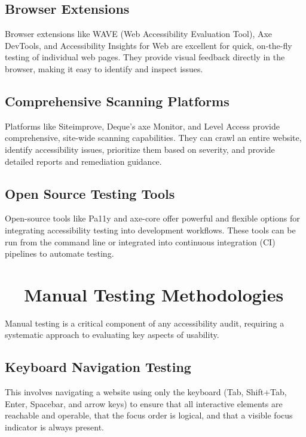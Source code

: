 \subsection{Browser Extensions}
\label{subsec:browser-extensions}
Browser extensions like WAVE (Web Accessibility Evaluation Tool), Axe DevTools, and Accessibility Insights for Web are excellent for quick, on-the-fly testing of individual web pages. They provide visual feedback directly in the browser, making it easy to identify and inspect issues.
\supercite{WebAIMWave, DequeAxeDevTools, MicrosoftInsights}

\subsection{Comprehensive Scanning Platforms}
\label{subsec:scanning-platforms}
Platforms like Siteimprove, Deque's axe Monitor, and Level Access provide comprehensive, site-wide scanning capabilities. They can crawl an entire website, identify accessibility issues, prioritize them based on severity, and provide detailed reports and remediation guidance.
\supercite{SiteimproveAccessibility, DequeWorldSpace, AudioEyeTesting}

\subsection{Open Source Testing Tools}
\label{subsec:open-source-tools}
Open-source tools like Pa11y and axe-core offer powerful and flexible options for integrating accessibility testing into development workflows. These tools can be run from the command line or integrated into continuous integration (CI) pipelines to automate testing.
\supercite{Pa11y, Lighthouse, DequeAxeCore}

\section{~~Manual Testing Methodologies}
\label{sec:manual-methodologies}
Manual testing is a critical component of any \gls{accessibility} audit, requiring a systematic approach to evaluating key aspects of usability.

\subsection{Keyboard Navigation Testing}
\label{subsec:keyboard-testing}
This involves navigating a website using only the keyboard (Tab, Shift+Tab, Enter, Spacebar, and arrow keys) to ensure that all interactive elements are reachable and operable, that the focus order is logical, and that a visible focus indicator is always present.
\supercite{WebAIMKeyboardA11y}

